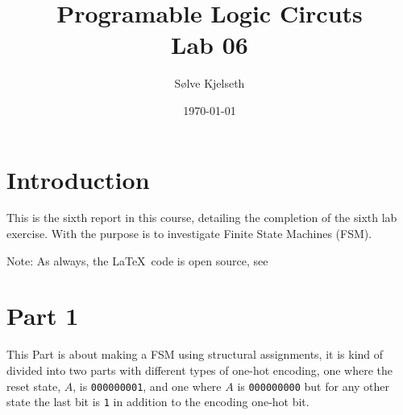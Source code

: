 \documentclass{article}
\title{\fontsize{24}{36}\selectfont Programable Logic Circuts\\ %
Lab 06} %
\author{{\ttfamily Sølve Kjelseth}} %
\date{\today} %
\begin{document}
\maketitle %



\section{Introduction} %
This is the sixth report in this course, detailing the completion of the sixth lab exercise. With the purpose is to investigate Finite State Machines (FSM).\par
Note: As always, the \LaTeX\ code is open source, see

\clearpage
\tableofcontents %
\hfill
\listoffigures %
\hfill
\listoftables %



\section{Part 1}
This Part is about making a FSM using structural assignments, it is kind of divided into two parts with different types of one-hot encoding, one where the reset state, \(A\), is \verb|000000001|, and one where \(A\) is \verb|000000000| but for any other state the last bit is \verb|1| in addition to the encoding one-hot bit.
\end{document}
